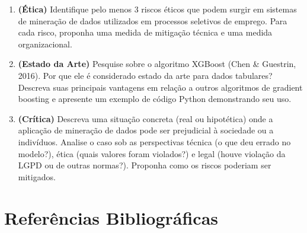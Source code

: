 \documentclass[12pt,a4paper]{article}
\begin{document}
\begin{enumerate}[leftmargin=*, label=\textbf{Exercício \arabic*.}]
  \item \textbf{(Ética)} Identifique pelo menos 3 riscos éticos que podem surgir em sistemas de mineração de dados utilizados em processos seletivos de emprego. Para cada risco, proponha uma medida de mitigação técnica e uma medida organizacional.

  \item \textbf{(Estado da Arte)} Pesquise sobre o algoritmo XGBoost (Chen \& Guestrin, 2016). Por que ele é considerado estado da arte para dados tabulares? Descreva suas principais vantagens em relação a outros algoritmos de gradient boosting e apresente um exemplo de código Python demonstrando seu uso.

  \item \textbf{(Crítica)} Descreva uma situação concreta (real ou hipotética) onde a aplicação de mineração de dados pode ser prejudicial à sociedade ou a indivíduos. Analise o caso sob as perspectivas técnica (o que deu errado no modelo?), ética (quais valores foram violados?) e legal (houve violação da LGPD ou de outras normas?). Proponha como os riscos poderiam ser mitigados.

\end{enumerate}

\section{Referências Bibliográficas}
\end{document}
